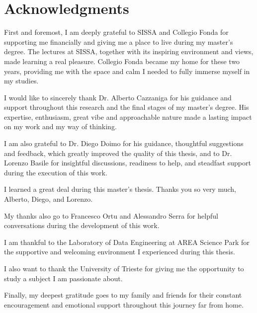 \chapter*{Acknowledgments}

First and foremost, I am deeply grateful to SISSA and Collegio Fonda for supporting me financially and giving me a place to live during my master's degree. The lectures at SISSA, together with its inspiring environment and views, made learning a real pleasure. Collegio Fonda became my home for these two years, providing me with the space and calm I needed to fully immerse myself in my studies.

I would like to sincerely thank Dr. Alberto Cazzaniga for his guidance and support throughout this research and the final stages of my master's degree. His expertise, enthusiasm, great vibe and approachable nature made a lasting impact on my work and my way of thinking.

I am also grateful to Dr. Diego Doimo for his guidance, thoughtful suggestions and feedback, which greatly improved the quality of this thesis, and to Dr. Lorenzo Basile for insightful discussions, readiness to help, and steadfast support during the execution of this work.

I learned a great deal during this master's thesis. Thanks you so very much, Alberto, Diego, and Lorenzo.

My thanks also go to Francesco Ortu and Alessandro Serra for helpful conversations during the development of this work.

I am thankful to the Laboratory of Data Engineering at AREA Science Park for the supportive and welcoming environment I experienced during this thesis.

I also want to thank the University of Trieste for giving me the opportunity to study a subject I am passionate about.

Finally, my deepest gratitude goes to my family and friends for their constant encouragement and emotional support throughout this journey far from home.